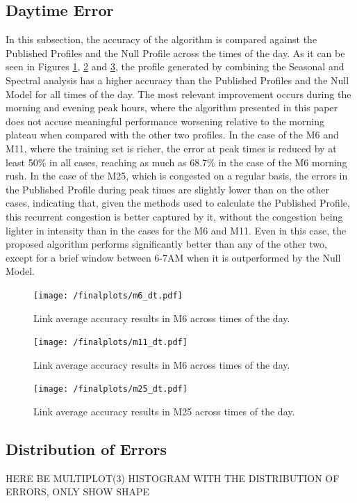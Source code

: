 \documentclass[conference]{IEEEtran}
\begin{document}
\subsection{Daytime Error}
In this subsection, the accuracy of the algorithm is compared against the Published Profiles and the Null Profile across the times of the day.
As it can be seen in Figures \ref{fig:m6daytime}, \ref{fig:m11daytime} and \ref{fig:m25daytime}, the profile generated by combining the Seasonal and Spectral analysis has a higher accuracy than the Published Profiles and the Null Model for all times of the day. 
The most relevant improvement occurs during the morning and evening peak hours, where the algorithm presented in this paper does not accuse meaningful performance worsening relative to the morning plateau when compared with the other two profiles. 
In the case of the M6 and M11, where the training set is richer, the error at peak times is reduced by at least 50\% in all cases, reaching as much as 68.7\% in the case of the M6 morning rush.
In the case of the M25, which is congested on a regular basis, the errors in the Published Profile during peak times are slightly lower than on the other cases, indicating that, given the methods used to calculate the Published Profile, this recurrent congestion is better captured by it, without the congestion being lighter in intensity than in the cases for the M6 and M11. 
Even in this case, the proposed algorithm performs significantly better than any of the other two, except for a brief window between 6-7AM when it is outperformed by the Null Model.
\begin{figure}[htbp]
	\centering
		\texttt{[image: /finalplots/m6\_dt.pdf]}
	\caption{Link average accuracy results in M6 across times of the day.}
	\label{fig:m6daytime}
\end{figure}

\begin{figure}[htbp]
	\centering
	\texttt{[image: /finalplots/m11\_dt.pdf]}
	\caption{Link average accuracy results in M6 across times of the day.}
	\label{fig:m11daytime}
\end{figure}

\begin{figure}[htbp]
	\centering
	\texttt{[image: /finalplots/m25\_dt.pdf]}
	\caption{Link average accuracy results in M25 across times of the day.}
	\label{fig:m25daytime}
\end{figure}
\subsection{Distribution of Errors}
HERE BE MULTIPLOT(3) HISTOGRAM WITH THE DISTRIBUTION OF ERRORS, ONLY SHOW SHAPE
\end{document}
